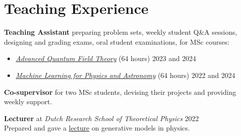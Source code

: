 \documentclass[11pt, letterpaper]{article}
\newcommand{\dateright}[1]{\hfill{\small\color{accentblue} #1}}
\begin{document}
\section*{Teaching Experience}
\noindent
\textbf{Teaching Assistant} preparing problem sets, weekly student Q\&A sessions, designing and grading exams, oral student examinations, for MSc courses:
\begin{itemize}
    \item \href{https://coursecatalogue.uva.nl/xmlpages/page/2023-2024-en/search-course/course/109196}{\textit{Advanced Quantum Field Theory}} (64 hours) \dateright{2023 and 2024}
    \item \href{https://coursecatalogue.uva.nl/xmlpages/page/2022-2023-en/search-course/course/99394}{\textit{Machine Learning for Physics and Astronomy}} (64 hours) \dateright{2022 and 2024}
\end{itemize}

\vspace{0.2cm}
\noindent
\textbf{Co-supervisor} for two MSc students, devising their projects and providing weekly support.

\vspace{0.2cm}
\noindent
\textbf{Lecturer} at \textit{Dutch Research School of Theoretical Physics} \dateright{2022} \\
Prepared and gave a \href{https://www.drstp.nl/wp-content/uploads/2022/06/THEP-Schedule-2022.pdf}{lecture} on generative models in physics.


\end{document}
